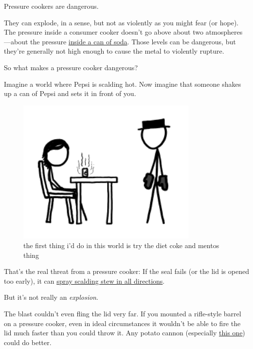 {Pressure cookers are dangerous.}

{They can explode, in a sense, but not as violently as you might fear (or hope). The pressure inside a consumer cooker doesn’t go above about two atmospheres—about the pressure \href{http://hypertextbook.com/facts/2000/SeemaMeraj.shtml}{inside a can of soda}. Those levels can be dangerous, but they’re generally not high enough to cause the metal to violently rupture.}

{So what makes a pressure cooker dangerous?}

{Imagine a world where Pepsi is scalding hot. Now imagine that someone shakes up a can of Pepsi and sets it in front of you.}

\begin{figure}[!htbp]
\centering
\includegraphics[scale=0.5, max width=0.8\textwidth]{imgs/a/40/pressure_cooker_pepsi.png}
\caption{the first thing i’d do in this world is try the diet coke and mentos thing}
\end{figure}

{That’s the real threat from a pressure cooker: If the seal fails (or the lid is opened too early), it can \href{http://www.flickr.com/photos/12670995@N02/1888382766/}{spray scalding stew in all directions}.}

{But it’s not really an \emph{explosion}.}

{The blast couldn’t even fling the lid very far. If you mounted a rifle-style barrel on a pressure cooker, even in ideal circumstances it wouldn’t be able to fire the lid much faster than you could throw it. Any potato cannon (especially \href{http://www.spudfiles.com/forums/mk-2-rotary-barrel-semi-automatic-combustion-t15766.html}{this one}) could do better.}

